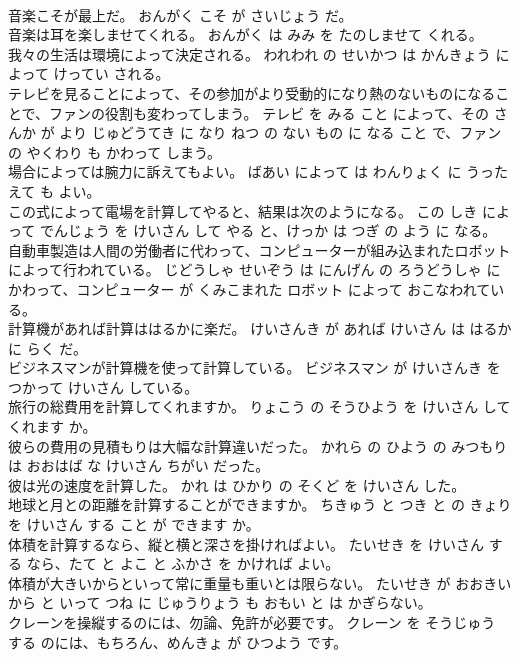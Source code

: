 \documentclass[8pt]{extreport}
\begin{document}
\begin{CJK}{UTF8}{min}
\\	音楽こそが最上だ。	おんがく こそ が さいじょう だ。	
\\	音楽は耳を楽しませてくれる。	おんがく は みみ を たのしませて くれる。	
\\	我々の生活は環境によって決定される。	われわれ の せいかつ は かんきょう によって けってい される。	
\\	テレビを見ることによって、その参加がより受動的になり熱のないものになることで、ファンの役割も変わってしまう。	テレビ を みる こと によって、その さんか が より じゅどうてき に なり ねつ の ない もの に なる こと で、ファン の やくわり も かわって しまう。	
\\	場合によっては腕力に訴えてもよい。	ばあい によって は わんりょく に うったえて も よい。	
\\	この式によって電場を計算してやると、結果は次のようになる。	この しき によって でんじょう を けいさん して やる と、けっか は つぎ の よう に なる。	
\\	自動車製造は人間の労働者に代わって、コンピューターが組み込まれたロボットによって行われている。	じどうしゃ せいぞう は にんげん の ろうどうしゃ に かわって、コンピューター が くみこまれた ロボット によって おこなわれている。	
\\	計算機があれば計算ははるかに楽だ。	けいさんき が あれば けいさん は はるか に らく だ。	
\\	ビジネスマンが計算機を使って計算している。	ビジネスマン が けいさんき を つかって けいさん している。	
\\	旅行の総費用を計算してくれますか。	りょこう の そうひよう を けいさん して くれます か。	
\\	彼らの費用の見積もりは大幅な計算違いだった。	かれら の ひよう の みつもり は おおはば な けいさん ちがい だった。	
\\	彼は光の速度を計算した。	かれ は ひかり の そくど を けいさん した。	
\\	地球と月との距離を計算することができますか。	ちきゅう と つき と の きょり を けいさん する こと が できます か。	
\\	体積を計算するなら、縦と横と深さを掛ければよい。	たいせき を けいさん する なら、たて と よこ と ふかさ を かければ よい。	
\\	体積が大きいからといって常に重量も重いとは限らない。	たいせき が おおきい から と いって つね に じゅうりょう も おもい と は かぎらない。	
\\	クレーンを操縦するのには、勿論、免許が必要です。	クレーン を そうじゅう する のには、もちろん、めんきょ が ひつよう です。	

\end{CJK}
\end{document}
